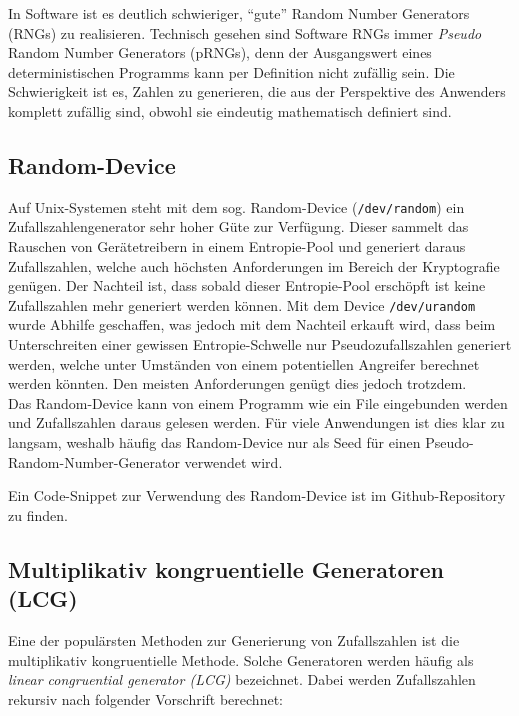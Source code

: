\documentclass{book}
\begin{document}
\begin{refsection}
In Software ist es deutlich schwieriger, ``gute'' Random Number Generators (RNGs) zu realisieren. Technisch gesehen sind Software RNGs immer \textit{Pseudo} Random Number Generators (pRNGs),  denn der Ausgangswert eines deterministischen Programms kann per Definition nicht zufällig sein. Die Schwierigkeit ist es, Zahlen zu generieren, die aus der Perspektive des Anwenders komplett zufällig sind, obwohl sie eindeutig mathematisch definiert sind.

\subsection{Random-Device} \label{subsec:RandomDev}

Auf Unix-Systemen steht mit dem sog. Random-Device (\texttt{/dev/random}) ein Zufallszahlengenerator sehr hoher Güte zur Verfügung. Dieser sammelt das Rauschen von Gerätetreibern in einem Entropie-Pool und generiert daraus Zufallszahlen, welche auch höchsten Anforderungen im Bereich der Kryptografie genügen. Der Nachteil ist, dass sobald dieser Entropie-Pool erschöpft ist keine Zufallszahlen mehr generiert werden können. Mit dem Device \texttt{/dev/urandom} wurde Abhilfe geschaffen, was jedoch mit dem Nachteil erkauft wird, dass beim Unterschreiten einer gewissen Entropie-Schwelle nur Pseudozufallszahlen generiert werden, welche unter Umständen von einem potentiellen Angreifer berechnet werden könnten. Den meisten Anforderungen genügt dies jedoch trotzdem. \\

Das Random-Device kann von einem Programm wie ein File eingebunden werden und Zufallszahlen daraus gelesen werden. Für viele Anwendungen ist dies klar zu langsam, weshalb häufig das Random-Device nur als Seed für einen Pseudo-Random-Number-Generator verwendet wird.

Ein Code-Snippet zur Verwendung des Random-Device ist im Github-Repository \cite{rng:githubRepo} zu finden.


\subsection{Multiplikativ kongruentielle Generatoren (LCG)} \label{subsec:LCG}
Eine der populärsten Methoden zur Generierung von Zufallszahlen ist die multiplikativ kongruentielle Methode. Solche Generatoren werden häufig als \textit{linear congruential generator (LCG)} bezeichnet. Dabei werden Zufallszahlen rekursiv nach folgender Vorschrift berechnet:


\end{refsection}
\end{document}

